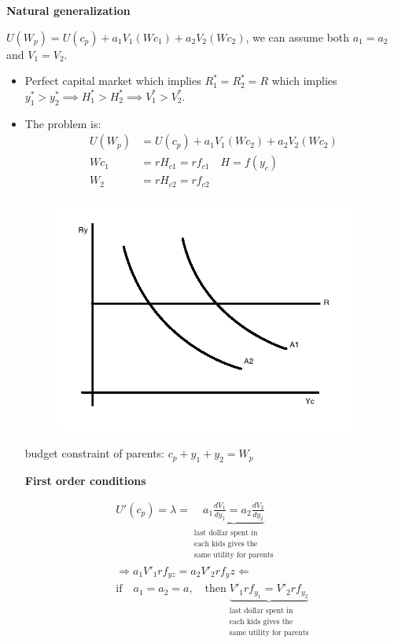 \documentclass[14pt,notitlepage]{article}
\begin{document}
\textbf{Natural generalization}

$U(W_p) = U(c_p) + a_1 V_1 (Wc_1) + a_2 V_2 (Wc_2)$, we can assume both $a_1 = a_2$ and $V_1 = V_2$.
\begin{itemize}
\item Perfect capital market which implies $R^*_1 = R^*_2 = R$ which implies $y^*_1 > y^*_2 \implies H^*_1 > H^*_2 \implies V^*_1 > V^*_2$.
\item The problem is:
\begin{align*}
U(W_p) &= U(c_p) + a_1 V_1 (Wc_2) + a_2 V_2 (Wc_2) \\
Wc_1 &= r H_{c1} = r f_{c1} \quad H = f(y_c) \\
W_2 &= r H_{c2} = r f_{c2} \\
\end{align*}

\begin{center}
\begin{figure}[H] 
\caption{}
\centering
\includegraphics[width=4in, height=3in]{plot8.png}
\end{figure}
\end{center}

budget constraint of parents: $c_p + y_1 + y_2 = W_p$

\textbf{First order conditions}

\begin{align*}
U'(c_p) = \lambda = \underbrace{a_1 \frac{dV_1}{dy_1} = a_2 \frac{dV_2}{dy_2}}_{\substack{\text{last dollar spent in} \\ \text{each kids gives the} \\ \text{same utility for parents}}} \\
\Rightarrow a_1 V'_1 r f_{yz} = a_2 V'_2 r f_yz \Leftarrow \\
\text{if} \quad a_1 = a_2 = a, \quad \text{then} \underbrace{V'_1 r f_{y_1} = V'_2 r f_{y_2}}_{\substack{\text{last dollar spent in} \\ \text{each kids gives the} \\ \text{same utility for parents}}} \\
\end{align*}


\end{itemize}
\end{document}
